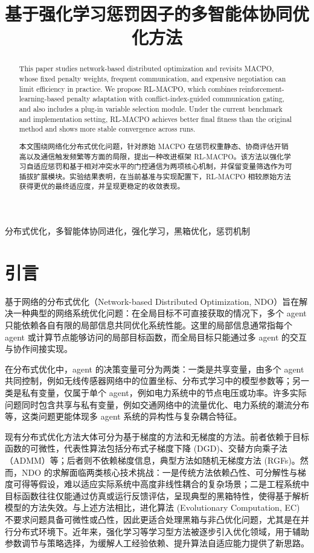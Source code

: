 \documentclass[conference]{IEEEtran}
\author{\IEEEauthorblockN{张颖婕}
\IEEEauthorblockA{\textit{计算机学院}\\
\textit{广东工业大学}\\
广州，中国\\
2122405235}}
\begin{document}
\title{基于强化学习惩罚因子的多智能体协同优化方法}
\maketitle

\begin{abstract}
  This paper studies network-based distributed optimization and revisits MACPO, whose fixed penalty weights, frequent communication, and expensive negotiation can limit efficiency in practice. We propose RL-MACPO, which combines reinforcement-learning-based penalty adaptation with conflict-index-guided communication gating, and also includes a plug-in variable selection module. Under the current benchmark and implementation setting, RL-MACPO achieves better final fitness than the original method and shows more stable convergence across runs.

本文围绕网络化分布式优化问题，针对原始 MACPO 在惩罚权重静态、协商评估开销高以及通信触发频繁等方面的局限，提出一种改进框架 RL-MACPO。该方法以强化学习自适应惩罚和基于相对冲突水平的门控通信为两项核心机制，并保留变量筛选作为可插拔扩展模块。实验结果表明，在当前基准与实现配置下，RL-MACPO 相较原始方法获得更优的最终适应度，并呈现更稳定的收敛表现。
\end{abstract}

\begin{IEEEkeywords}
分布式优化，多智能体协同进化，强化学习，黑箱优化，惩罚机制
\end{IEEEkeywords}

\section{引言}\label{ux5f15ux8a00}

基于网络的分布式优化（Network-based Distributed Optimization,
NDO）旨在解决一种典型的网络系统优化问题：在全局目标不可直接获取的情况下，多个
agent
只能依赖各自有限的局部信息共同优化系统性能。这里的局部信息通常指每个
agent 或计算节点能够访问的局部目标函数，而全局目标只能通过多 agent
的交互与协作间接实现。

在分布式优化中，agent 的决策变量可分为两类：一类是共享变量，由多个 agent
共同控制，例如无线传感器网络中的位置坐标、分布式学习中的模型参数等；另一类是私有变量，仅属于单个
agent，例如电力系统中的节点电压或功率。许多实际问题同时包含共享与私有变量，例如交通网络中的流量优化、电力系统的潮流分布等，这类问题更能体现多
agent 系统的异构性与复杂耦合特征。

现有分布式优化方法大体可分为基于梯度的方法和无梯度的方法。前者依赖于目标函数的可微性，代表性算法包括分布式子梯度下降
(DGD)、交替方向乘子法（ADMM）等；后者则不依赖梯度信息，典型方法如随机无梯度方法
(RGFs)。然而，NDO 的求解面临两类核心技术挑战：一是传统方法依赖凸性、可分解性与梯度可得等假设，难以适应实际系统中高度非线性耦合的复杂场景；二是工程系统中目标函数往往仅能通过仿真或运行反馈评估，呈现典型的黑箱特性，使得基于解析模型的方法失效。与上述方法相比，进化算法 (Evolutionary Computation, EC)
不要求问题具备可微性或凸性，因此更适合处理黑箱与非凸优化问题，尤其是在并行分布式环境下。近年来，强化学习等学习型方法被逐步引入优化领域，用于辅助参数调节与策略选择，为缓解人工经验依赖、提升算法自适应能力提供了新思路。
\end{document}
